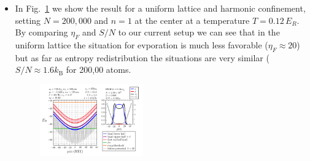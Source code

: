 \documentclass[11pt,letter]{article}
\begin{document}
\begin{itemize}
\item In Fig.~\ref{fig:profiles005} we show the result for a uniform lattice
and harmonic confinement,  setting $N=200,000$ and $n=1$ at the center at a
temperature $T=0.12\,E_{R}$.    By comparing $\eta_{F}$ and $S/N$ to our
current setup we can see that in the uniform lattice the situation for
evporation is much less favorable ($\eta_{F} \approx 20$) but as far as entropy
redistribution the situations are very similar ($S/N\approx 1.6k_{\text{B}}$
for 200,00 atoms. 
\begin{figure}[H]
        \centering
		\includegraphics[width=0.42\textwidth]{figures_hubbard-lda/005.png}
	\caption{}
                \label{fig:profiles005}
\end{figure}


\end{itemize}
\end{document}
